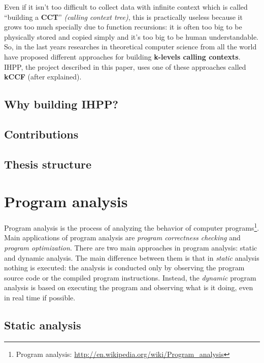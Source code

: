 \documentclass[a4paper,11pt]{report}
\begin{document}
Even if it isn't too difficult to collect data with infinite context which is called ``building a \textbf{CCT}'' \emph{(calling context tree)}, this is practically useless because it grows too much specially due to function recursions: it is often too big to be physically stored and copied simply and it's too big to be human understandable. 
So, in the last years researches in theoretical computer science from all the world have proposed different approaches for building \textbf{k-levels calling contexts}. IHPP, the project described in this paper, uses one of these approaches called \textbf{kCCF} (after explained).

\section{Why building IHPP?}



\section{Contributions}
\section{Thesis structure}

\chapter{Program analysis}

Program analysis is the process of analyzing the behavior of computer programs\footnote{Program analysis: \url{http://en.wikipedia.org/wiki/Program_analysis}}. Main applications of program analysis are \emph{program correctness checking} and \emph{program optimization}.
There are two main approaches in program analysis: static and dynamic analysis.
The main difference between them is that in \emph{static} analysis nothing is executed: the analysis
is conducted only by observing the program source code or the compiled program instructions. Instead, the \emph{dynamic} program analysis is based on executing the program and observing what is it doing, even in real time if possible.

\section{Static analysis}
\end{document}
